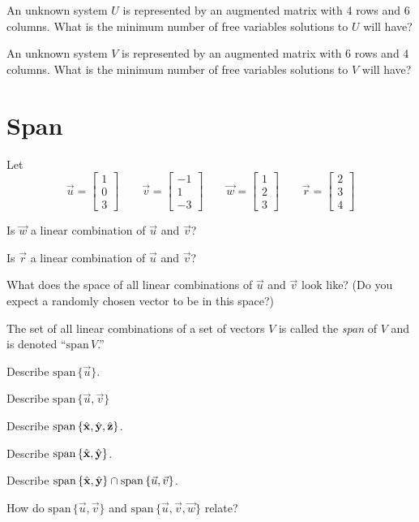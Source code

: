 \documentclass{article}
\newcommand{\xh}{\hat{\bf x}}
\newcommand{\yh}{\hat{\bf y}}
\newcommand{\zh}{\hat{\bf z}}
\renewcommand{\span}{\mathrm{span}\,}
\newcommand{\mat}[1]{\begin{bmatrix}#1\end{bmatrix}}
\begin{document}
	\begin{Enum}
		\item An unknown system $U$ is represented by an augmented
		matrix with 4 rows and 6 columns.  What is 
		the minimum number of
		free variables solutions to $U$ will have?
		\item An unknown system $V$ is represented by an augmented
		matrix with 6 rows and 4 columns.  What is 
		the minimum number of
		free variables solutions to $V$ will have?
	\end{Enum}

\newpage

\section*{Span}
	Let
	\[
		\vec u=\mat{1\\0\\3} \qquad \vec v=\mat{-1\\1\\-3}
		\qquad \vec w=\mat{1\\2\\3} \qquad \vec r=\mat{2\\3\\4}
	\]

	\begin{Enum}
		\item Is $\vec w$ a linear combination of $\vec u$ and $\vec v$?
		\item Is $\vec r$ a linear combination of $\vec u$ and $\vec v$?
		\item What does the space of all linear combinations of 
		$\vec u$ and $\vec v$ look like? (Do you expect a randomly 
		chosen vector to be in this space?)
	\end{Enum}

	The set of all linear combinations of a set of vectors $V$ is called
	the \emph{span} of $V$ and is denoted ``$\span V$.''
	\begin{Enum}
		\item Describe $\span\{\vec u\}$.
		\item Describe $\span\{\vec u,\vec v\}$
		\item Describe $\span\{\xh,\yh,\zh\}$.
		\item Describe $\span\{\xh,\yh\}$.
		\item Describe $\span\{\xh,\yh\}\cap \span\{\vec u,\vec v\}$.
	\end{Enum}
	\begin{Enum}
		\item How do $\span\{\vec u,\vec v\}$ and
		$\span\{\vec u,\vec v,\vec w\}$ relate?
	\end{Enum}
\end{document}
